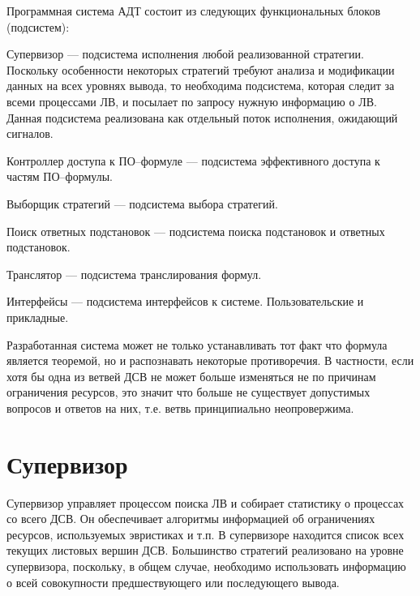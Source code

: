 Программная система АДТ состоит из следующих функциональных блоков (подсистем):
\begin{description}
  \item{Супервизор} --- подсистема исполнения любой реализованной стратегии. Поскольку особенности некоторых стратегий требуют анализа и модификации данных на всех уровнях вывода, то необходима подсистема, которая следит за всеми процессами ЛВ, и посылает по запросу нужную информацию о ЛВ. Данная подсистема реализована как отдельный поток исполнения, ожидающий сигналов.
  \item{Контроллер доступа к ПО--формуле} --- подсистема эффективного доступа к частям ПО--формулы.
  \item{Выборщик стратегий} --- подсистема выбора стратегий.
  \item{Поиск ответных подстановок} --- подсистема поиска подстановок и ответных подстановок.
  \item{Транслятор} --- подсистема транслирования формул.
  \item{Интерфейсы} --- подсистема интерфейсов к системе. Пользовательские и прикладные.

\end{description}

Разработанная система может не только устанавливать тот факт что формула является теоремой, но и распознавать некоторые противоречия. В частности, если хотя бы одна из ветвей ДСВ не может больше изменяться не по причинам ограничения ресурсов, это значит что больше не существует допустимых вопросов и ответов на них, т.е. ветвь принципиально неопровержима.


\section{Супервизор}
Супервизор управляет процессом поиска ЛВ и собирает статистику о процессах со всего ДСВ. Он обеспечивает алгоритмы информацией об ограничениях ресурсов, используемых эвристиках и т.п. В супервизоре находится список всех текущих листовых вершин ДСВ. Большинство стратегий реализовано на уровне супервизора, поскольку, в общем случае, необходимо использовать информацию о всей совокупности предшествующего или последующего вывода.

